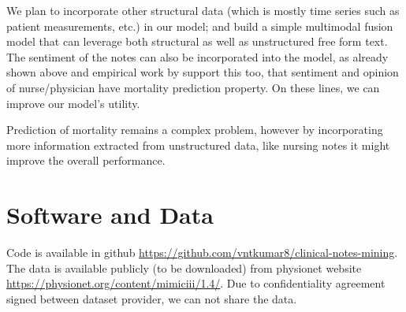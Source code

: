 \documentclass[11pt,a4paper]{article}
\begin{document}
We plan to incorporate other structural data (which is mostly time series such as patient measurements, etc.) in our model; and build a simple multimodal fusion model that can leverage both structural as well as unstructured free form text. The sentiment of the notes can also be incorporated into the model, as already shown above and empirical work by \citet{Smith18} support this too, that sentiment and opinion of nurse/physician have mortality prediction property. On these lines, we can improve our model’s utility.

Prediction of mortality remains a complex problem, however by incorporating more information extracted from unstructured data, like nursing notes it might improve the overall performance. 

\section*{Software and Data}

Code is available in github \url{https://github.com/vntkumar8/clinical-notes-mining}. \\
The data is available publicly (to be downloaded) from physionet website \url{https://physionet.org/content/mimiciii/1.4/}.  Due to confidentiality agreement signed between dataset provider, we can not share the data. 

	
	
\end{document}
